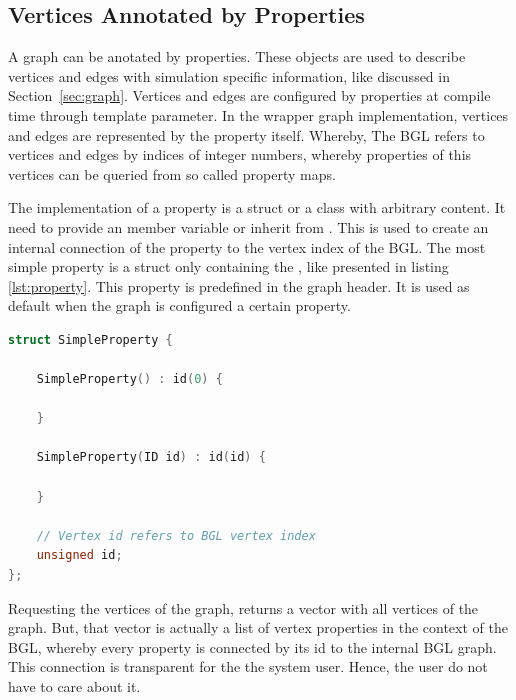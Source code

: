 \subsection{Vertices Annotated by Properties}

A graph can be anotated by properties. These objects are used to
describe vertices and edges with simulation specific information, like
discussed in Section~\ref{sec:graph}. Vertices and edges are
configured by properties at compile time through template
parameter. In the wrapper graph implementation, vertices and edges are
represented by the property itself. Whereby, The BGL refers to
vertices and edges by indices of integer numbers, whereby properties
of this vertices can be queried from so called property maps.

The implementation of a property is a struct or a class with arbitrary
content. It need to provide an  member variable or inherit
from . This  is used to create an internal
connection of the property to the vertex index of the BGL.  The most
simple property is a struct only containing the , like
presented in listing \ref{lst:property}. This property is predefined
in the graph header. It is used as default when the graph is
configured a certain property.

\begin{lstlisting}[language=C++, label=lst:property]
struct SimpleProperty {

    SimpleProperty() : id(0) {

    }
    
    SimpleProperty(ID id) : id(id) {

    }

    // Vertex id refers to BGL vertex index
    unsigned id;
};
\end{lstlisting}

Requesting the vertices of the graph, returns a vector with all
vertices of the graph. But, that vector is actually a list of vertex
properties in the context of the BGL, whereby every property is
connected by its id to the internal BGL graph. This connection is transparent for
the the system user. Hence, the user do not have to care about it.

